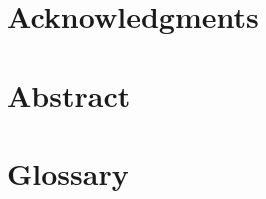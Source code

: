 \documentclass[12pt]{article}
\begin{document}
\section*{Acknowledgments}
\newpage


\section*{Abstract}
\newpage


\newpage
\renewcommand{\contentsname}{Table of contents}
\tableofcontents


\section*{Glossary}
\vspace{0.5cm}
\end{document}
